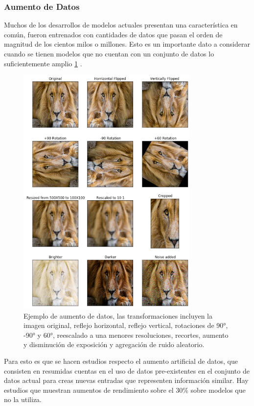 \documentclass[letter,12pt]{report}
\begin{document}
\subsubsection{Aumento de Datos}
Muchos de los desarrollos de modelos actuales presentan una característica en común,
fueron entrenados con cantidades de datos que pasan el orden de magnitud de los cientos
milos o millones. Esto es un importante dato a considerar cuando se tienen modelos que
no cuentan con un conjunto de datos lo suficientemente amplio \ref{fig:dataaugmen}
\cite{Dataaug}.

\begin{figure}[H]
    \centering
    \includegraphics[width=0.8\textwidth]{dataaugmen}
    \caption{Ejemplo de aumento de datos, las transformaciones incluyen la imagen
        original, reflejo horizontal, reflejo vertical, rotaciones de 90°, -90° y 60°,
        reescalado a una menores resoluciones, recortes, aumento y disminución de exposición y
    agregación de ruido aleatorio.}
    \label{fig:dataaugmen}
\end{figure}

Para esto es que se hacen estudios respecto el aumento artificial de datos, que consisten
en resumidas cuentas en el uso de datos pre-existentes en el conjunto de datos actual
para creas nuevas entradas que representen información similar. Hay estudios que muestran
aumentos de rendimiento sobre el 30\% \cite{Augment} sobre modelos que no la utiliza.
\end{document}
